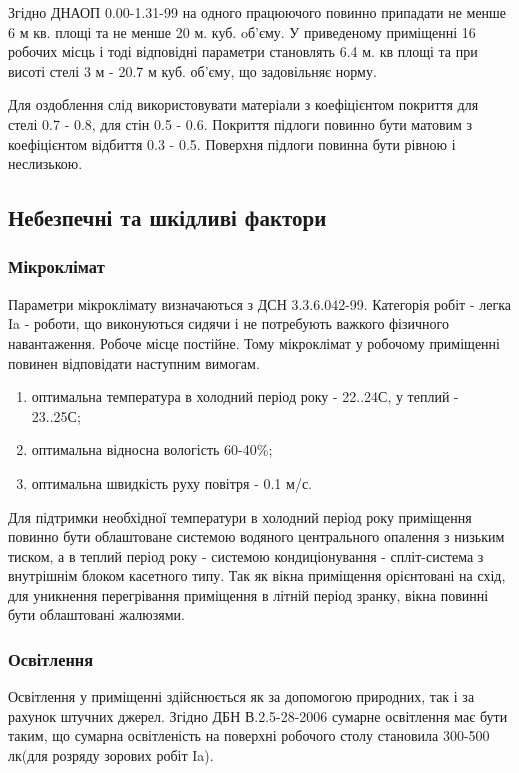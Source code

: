    Згідно ДНАОП 0.00-1.31-99\cite{lab-dnaop} на одного працюючого повинно припадати не менше 6 м кв. площі та не менше 20 м. куб. oб'єму.
    У приведеному приміщенні 16 робочих місць і тоді відповідні параметри становлять 6.4 м. кв площі та при висоті стелі 3 м -  20.7 м куб. об'єму,
    що задовільняє норму.

    Для оздоблення слід використовувати матеріали з коефіцієнтом покриття для стелі 0.7 - 0.8, для стін 0.5 - 0.6.
    Покриття підлоги повинно бути матовим з коефіцієнтом відбиття 0.3 - 0.5. Поверхня підлоги повинна бути рівною і неслизькою.

\subsection{Небезпечні та шкідливі фактори}
    \subsubsection{Мікроклімат}
    Параметри мікроклімату визначаються з ДСН 3.3.6.042-99\cite{lab-dsn42}. Категорія робіт - легка Ia - роботи, що виконуються сидячи і не потребують
    важкого фізичного навантаження. Робоче місце постійне. Тому мікроклімат у робочому приміщенні повинен відповідати наступним вимогам.
    \begin{enumerate}
        \item оптимальна температура в холодний період року - 22..24С, у теплий - 23..25С;
        \item оптимальна відносна вологість 60-40\%;
        \item оптимальна швидкість руху повітря - 0.1 м/с.
    \end{enumerate}

    Для підтримки необхідної температури в холодний період року приміщення повинно бути облаштоване системою водяного центрального опалення з низьким тиском,
    а в теплий період року - системою кондиціонування -  спліт-система з внутрішнім блоком касетного типу.
    Так як вікна приміщення орієнтовані на схід, для уникнення перегрівання приміщення в літній період зранку, вікна повинні бути облаштовані жалюзями.

    \subsubsection{Освітлення}
    Освітлення у приміщенні здійснюється як за допомогою природних, так і за рахунок штучних джерел.
    Згідно ДБН В.2.5-28-2006\cite{lab-dbn28} сумарне освітлення має бути таким, що сумарна освітленість на поверхні робочого столу становила 300-500 лк(для розряду зорових робіт Ia).

